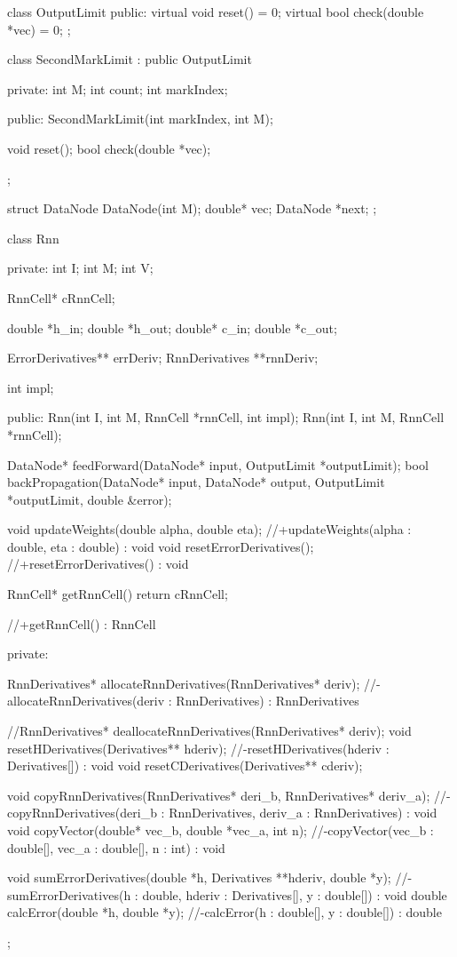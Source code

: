 class OutputLimit {
  public:
    virtual void reset() = 0;
    virtual bool check(double *vec) = 0;
};

class SecondMarkLimit : public OutputLimit {
  private:
    int M;
    int count;
    int markIndex;

  public:
    SecondMarkLimit(int markIndex, int M);

    void reset();
    bool check(double *vec);
};

struct DataNode{
  DataNode(int M);
  double* vec;
  DataNode *next;
};


class Rnn {
  private:
    int I;
    int M;
    int V;

    RnnCell* cRnnCell;


    double *h_in;
    double *h_out;
    double* c_in;
    double *c_out;

    ErrorDerivatives** errDeriv;
    RnnDerivatives **rnnDeriv;

    int impl;

  public:
    Rnn(int I, int M, RnnCell *rnnCell, int impl);
    Rnn(int I, int M, RnnCell *rnnCell);

    DataNode* feedForward(DataNode* input, OutputLimit *outputLimit);
    bool backPropagation(DataNode* input, DataNode* output, OutputLimit *outputLimit, double &error);

    void updateWeights(double alpha, double eta);
    //+updateWeights(alpha : double, eta : double) : void
    void resetErrorDerivatives();
    //+resetErrorDerivatives() : void


    RnnCell* getRnnCell(){
      return cRnnCell;
    }

    //+getRnnCell() : RnnCell

  private:

    RnnDerivatives* allocateRnnDerivatives(RnnDerivatives* deriv);
    //-allocateRnnDerivatives(deriv : RnnDerivatives) : RnnDerivatives

    //RnnDerivatives* deallocateRnnDerivatives(RnnDerivatives* deriv);
    void resetHDerivatives(Derivatives** hderiv);
    //-resetHDerivatives(hderiv : Derivatives[]) : void
    void resetCDerivatives(Derivatives** cderiv);


    void copyRnnDerivatives(RnnDerivatives* deri_b, RnnDerivatives* deriv_a);
    //-copyRnnDerivatives(deri_b : RnnDerivatives, deriv_a : RnnDerivatives) : void
    void copyVector(double* vec_b, double *vec_a, int n);
    //-copyVector(vec_b : double[], vec_a : double[], n : int) : void

    void sumErrorDerivatives(double *h, Derivatives **hderiv, double *y);
    //-sumErrorDerivatives(h : double, hderiv : Derivatives[], y : double[]) : void
    double calcError(double *h, double *y);
    //-calcError(h : double[], y : double[]) : double


};

